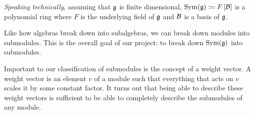\documentclass[11pt, reqno]{amsart}
\begin{document}
%
%

%
%
%

\emph{Speaking technically}, assuming that $\mathfrak{g}$ is finite dimensional, $\operatorname{Sym}(\mathfrak{g})\coloneqq F\left[ \mathcal{B} \right]$ 
is a polynomial ring where $F$ is the underlying field of $\mathfrak{g}$ and $\mathcal{B}$ is a basis of $\mathfrak{g}$.



Like how algebras break down into subalgebras, we can break down modules into
submodules. This is the overall goal of our project: to break down $\operatorname{Sym}(\mathfrak{g})$
into submodules.

Important to our classification of submodules is the concept of a weight vector.
A weight vector is an element $v$ of a module such that everything that acts on
$v$ scales it by some constant factor. It turns out that being able to describe
these weight vectors is sufficient to be able to completely describe the
submodules of any module.




\end{document}
